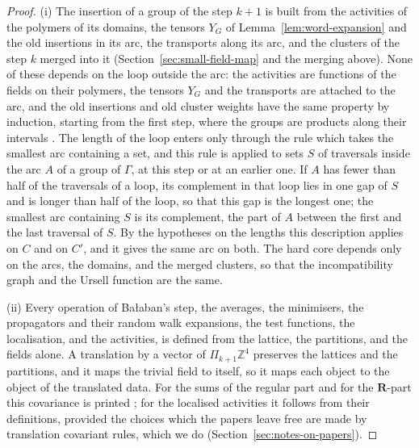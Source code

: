 \documentclass[11pt]{preprint}
\numberwithin{equation}{section}
\theoremstyle{definition}
\theoremstyle{remark}
\theoremstyle{plain}
\begin{document}
\begin{proof}
(i) The insertion of a group of the step $k + 1$ is built from the activities of the polymers of its domains, the tensors $Y_G$ of Lemma~\ref{lem:word-expansion} and the old insertions in its arc, the transports along its arc, and the clusters of the step $k$ merged into it (Section~\ref{sec:small-field-map} and the merging above). None of these depends on the loop outside the arc: the activities are functions of the fields on their polymers, the tensors $Y_G$ and the transports are attached to the arc, and the old insertions and old cluster weights have the same property by induction, starting from the first step, where the groups are products along their intervals \cite[Definition~3.24]{WilsonFirstStep}. The length of the loop enters only through the rule which takes the smallest arc containing a set, and this rule is applied to sets $S$ of traversals inside the arc $A$ of a group of $\Gamma$, at this step or at an earlier one. If $A$ has fewer than half of the traversals of a loop, its complement in that loop lies in one gap of $S$ and is longer than half of the loop, so that this gap is the longest one; the smallest arc containing $S$ is its complement, the part of $A$ between the first and the last traversal of $S$. By the hypotheses on the lengths this description applies on $C$ and on $C'$, and it gives the same arc on both. The hard core depends only on the arcs, the domains, and the merged clusters, so that the incompatibility graph and the Ursell function are the same.

(ii) Every operation of Ba{\l}aban's step, the averages, the minimisers, the propagators and their random walk expansions, the test functions, the localisation, and the activities, is defined from the lattice, the partitions, and the fields alone. A translation by a vector of $\Pi_{k+1}\mathbb Z^4$ preserves the lattices and the partitions, and it maps the trivial field to itself, so it maps each object to the object of the translated data. For the sums of the regular part and for the $\mathbf R$-part this covariance is printed \cite[(2.29), (2.32), p.~260]{BalabanCRE}; for the localised activities it follows from their definitions, provided the choices which the papers leave free are made by translation covariant rules, which we do (Section~\ref{sec:notes-on-papers}).
\end{proof}
\end{document}
